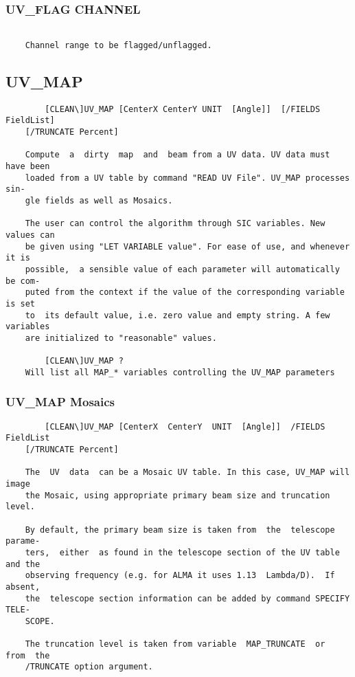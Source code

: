 \subsubsection{UV\_FLAG CHANNEL}
\begin{verbatim}

    Channel range to be flagged/unflagged.

\end{verbatim}
\subsection{UV\_MAP}
\begin{verbatim}
        [CLEAN\]UV_MAP [CenterX CenterY UNIT  [Angle]]  [/FIELDS  FieldList]
    [/TRUNCATE Percent]

    Compute  a  dirty  map  and  beam from a UV data. UV data must have been
    loaded from a UV table by command "READ UV File". UV_MAP processes  sin-
    gle fields as well as Mosaics.

    The user can control the algorithm through SIC variables. New values can
    be given using "LET VARIABLE value". For ease of use, and whenever it is
    possible,  a sensible value of each parameter will automatically be com-
    puted from the context if the value of the corresponding variable is set
    to  its default value, i.e. zero value and empty string. A few variables
    are initialized to "reasonable" values.

        [CLEAN\]UV_MAP ?
    Will list all MAP_* variables controlling the UV_MAP parameters

\end{verbatim}
\subsubsection{UV\_MAP Mosaics}
\begin{verbatim}
        [CLEAN\]UV_MAP [CenterX  CenterY  UNIT  [Angle]]  /FIELDS  FieldList
    [/TRUNCATE Percent]

    The  UV  data  can be a Mosaic UV table. In this case, UV_MAP will image
    the Mosaic, using appropriate primary beam size and truncation level.

    By default, the primary beam size is taken from  the  telescope  parame-
    ters,  either  as found in the telescope section of the UV table and the
    observing frequency (e.g. for ALMA it uses 1.13  Lambda/D).  If  absent,
    the  telescope section information can be added by command SPECIFY TELE-
    SCOPE.

    The truncation level is taken from variable  MAP_TRUNCATE  or  from  the
    /TRUNCATE option argument.


\end{verbatim}

